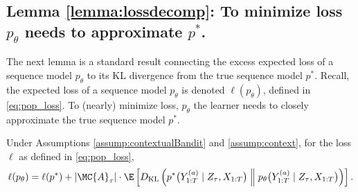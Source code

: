 \subsection{Lemma \ref{lemma:lossdecomp}: To minimize loss $p_\theta$ needs to approximate $p^*$.}
The next lemma is a standard result connecting the excess expected loss of a sequence model $p_{\theta}$ to its KL divergence from the true sequence model $p^*$. Recall, the expected loss of a sequence model $p_\theta$ is denoted $\ell(p_\theta)$, defined in \eqref{eq:pop_loss}. To (nearly) minimize loss, $p_\theta$ the learner needs to closely approximate the true sequence model $p^*$.
\begin{lemma}
    \label{lemma:lossdecomp}
    Under Assumptions \ref{assump:contextualBandit} and \ref{assump:context}, for the loss $\ell$ as defined in \eqref{eq:pop_loss},
    \[
    \ell(p_{\theta}) = \ell(p^*) + |\MC{A}_{\tau}| \cdot \E \left[D_{\rm KL}\left( p^* \big( Y_{1:T}^{(a)} \mid Z_{\tau}, X_{1:T} \big) \; \Big\| \; p_{\theta} \big( Y_{1:T}^{(a)} \mid Z_{\tau}, X_{1:T} \big) \right) \right]. 
    \]
\end{lemma}
